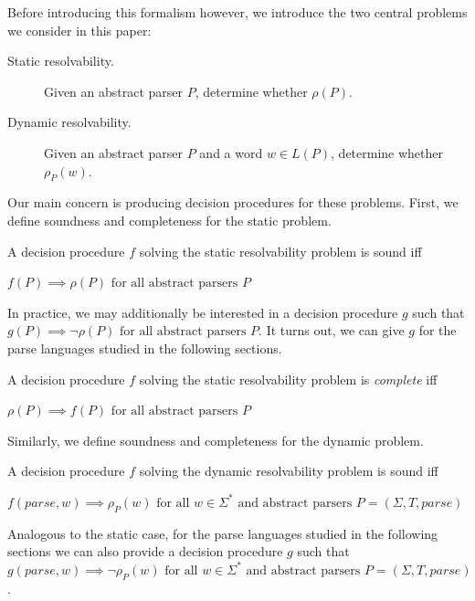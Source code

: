 \documentclass[acmsmall,review,anonymous]{acmart}\settopmatter{printfolios=true,printccs=false,printacmref=false}
\newcommand{\T}{\Sigma} %
\newcommand{\parse}{\mathit{parse}} %
\begin{document}
Before introducing this formalism however, we introduce the two central problems we consider in this paper:

\begin{description}
\item[Static resolvability.] Given an abstract parser $P$, determine whether $\rho(P)$.
\item[Dynamic resolvability.] Given an abstract parser $P$ and a word $w \in L(P)$, determine whether $\rho_P(w)$.
\end{description}

\noindent Our main concern is producing decision procedures for these problems. First, we define soundness and completeness for the static problem.

\begin{definition}\label{def:static-procedure-sound}
  A decision procedure $f$ solving the static resolvability problem is sound iff

  $f(P) \implies \rho(P) \text{ for all abstract parsers } P$
\end{definition}

In practice, we may additionally be interested in a decision procedure
$g$ such that $g(P) \implies \lnot \rho(P) \text{ for all abstract
  parsers } P$. It turns out, we can give $g$ for the parse languages
studied in the following sections.

\begin{definition}\label{def:static-procedure-complete}
  A decision procedure $f$ solving the static resolvability problem is \emph{complete} iff

  $\rho(P) \implies f(P) \text{ for all abstract parsers } P$
\end{definition}


\noindent Similarly, we define soundness and completeness for the dynamic problem.

\begin{definition}\label{def:dynamic-procedure-sound}
  A decision procedure $f$ solving the dynamic resolvability problem is sound iff

  $f(\parse, w) \implies \rho_P(w) \text{ for all } w \in \Sigma^{*} \text{ and abstract parsers } P = (\T, T, \parse)$
\end{definition}

Analogous to the static case, for the parse languages studied in the
following sections we can also provide a decision procedure $g$ such
that $g(\parse, w) \implies \lnot \rho_P(w) \text{ for all } w \in
\Sigma^{*} \text{ and abstract parsers } P = (\T, T, \parse)$.
\end{document}
